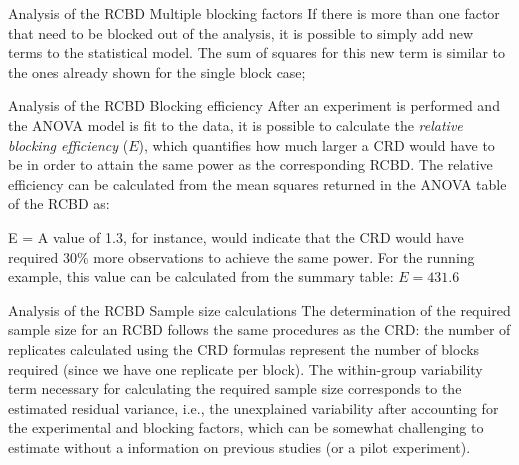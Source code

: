 \documentclass[t]{beamer}
\begin{document}

\begin{ftst}
{Analysis of the RCBD}
{Multiple blocking factors}
If there is more than one factor that need to be blocked out of the analysis, it is possible to simply add new terms to the statistical model. The sum of squares for this new term is similar to the ones already shown for the single block case;
\vone

\end{ftst}


\begin{ftst}
{Analysis of the RCBD}
{Blocking efficiency}
After an experiment is performed and the ANOVA model is fit to the data, it is possible to calculate the \textit{relative blocking efficiency} ($E$), which quantifies how much larger a CRD would have to be in order to attain the same power as the corresponding RCBD.
\vone
The relative efficiency can be calculated from the mean squares returned in the ANOVA table of the RCBD as:

\beqs
E = 
\eqs
\vhalf
A value of 1.3, for instance, would indicate that the CRD would have required $30\%$ more observations to achieve the same power. For the running example, this value can be calculated from the summary table: $ E = 431.6$
\end{ftst}


\begin{ftst}
{Analysis of the RCBD}
{Sample size calculations}
The determination of the required sample size for an RCBD follows the same procedures as the CRD: the number of replicates calculated using the CRD formulas represent the number of blocks required (since we have one replicate per block).
\vone
The within-group variability term necessary for calculating the required sample size corresponds to the estimated residual variance, i.e., the unexplained variability after accounting for the experimental and blocking factors, which can be somewhat challenging to estimate without a information on previous studies (or a pilot experiment).
\end{ftst}
\end{document}
